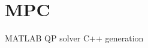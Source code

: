 \FloatBarrier\section{MPC} \label{sec:mpc}

        MATLAB
        QP solver
        C++ generation

        